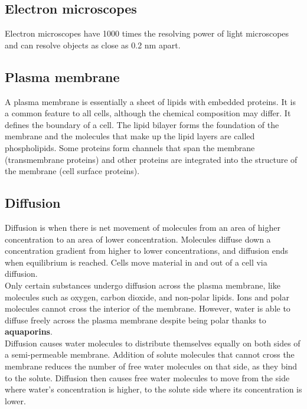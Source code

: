 \documentclass[11pt]{article}
\begin{document}
\subsection{Electron microscopes}
\label{sec:org4d00f9b}
Electron microscopes have 1000 times the resolving power of light microscopes and can resolve objects as close as 0.2 \(\unit{\nano\metre}\) apart.

\newpage

\subsection{Plasma membrane}
\label{sec:org6335b75}
A plasma membrane is essentially a sheet of lipids with embedded proteins. It is a common feature to all cells, although the chemical composition may differ. It defines the boundary of a cell. The lipid bilayer forms the foundation of the membrane and the molecules that make up the lipid layers are called phospholipids. Some proteins form channels that span the membrane (transmembrane proteins) and other proteins are integrated into the structure of the membrane (cell surface proteins).

\subsection{Diffusion}
\label{sec:orgd8b99ea}
Diffusion is when there is net movement of molecules from an area of higher concentration to an area of lower concentration. Molecules diffuse down a concentration gradient from higher to lower concentrations, and diffusion ends when equilibrium is reached. Cells move material in and out of a cell via diffusion.
\\[0pt]

Only certain substances undergo diffusion across the plasma membrane, like molecules such as oxygen, carbon dioxide, and non-polar lipids. Ions and polar molecules cannot cross the interior of the membrane. However, water is able to diffuse freely across the plasma membrane despite being polar thanks to \textbf{aquaporins}.
\\[0pt]

Diffusion causes water molecules to distribute themselves equally on both sides of a semi-permeable membrane. Addition of solute molecules that cannot cross the membrane reduces the number of free water molecules on that side, as they bind to the solute. Diffusion then causes free water molecules to move from the side where water's concentration is higher, to the solute side where its concentration is lower.
\end{document}
